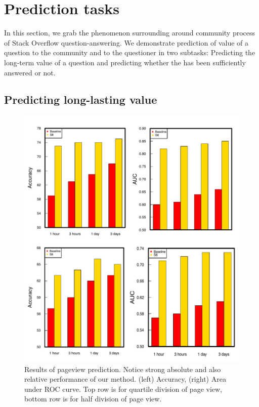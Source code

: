 \section{Prediction tasks}
In this section, we grab the phenomenon surrounding around community process of Stack Overflow question-answering. We demonstrate prediction of value of a question to the community and to the questioner in two subtasks: Predicting the long-term value of a question and predicting whether the has been sufficiently answered or not.
\subsection{Predicting long-lasting value}

\begin{figure}[!t]
    \centering
    \includegraphics[width=0.7\columnwidth]{img/task1.pdf}
    \caption{Results of pageview prediction. Notice strong absolute and also relative performance of our method. (left) Accuracy, (right) Area under ROC curve. Top row is for quartile division of page view, bottom row is for half division of page view.}
    \label{fig:task1}
\end{figure}


